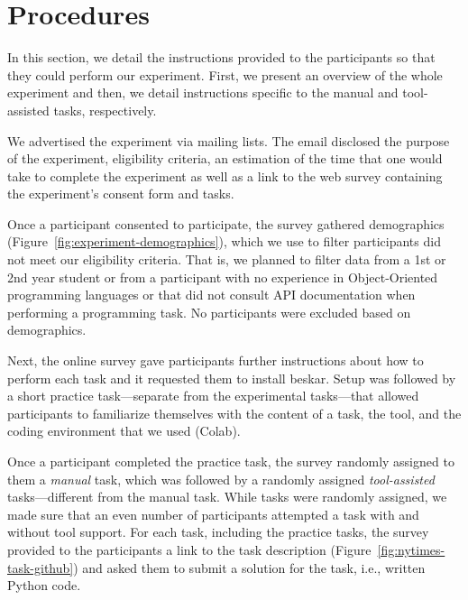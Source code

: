
\section{Procedures}
\label{cp6:procedures}





In this section, we detail the instructions provided to the participants so that 
they could perform our experiment. 
First, we present an overview of the whole experiment and then, we detail
instructions specific to the manual and tool-assisted tasks, respectively.



We advertised the experiment via mailing lists. The email disclosed the purpose of the experiment, eligibility criteria, an estimation of the time that one would take to complete the experiment as well as a link 
to the web survey containing the experiment's consent form and tasks. 




Once a participant consented to participate, the survey gathered demographics (Figure~\ref{fig:experiment-demographics}), which we use to filter participants did not meet our eligibility criteria. That is, we planned to filter data from a 1st or 2nd year student or from a participant with no experience in Object-Oriented programming languages or that did not consult API documentation when performing a programming task. No participants were excluded based on demographics.





Next, the online survey gave participants further instructions 
about how to perform each task and it requested them to install \acs{beskar}.
Setup was followed by a short practice task---separate from the experimental tasks---that allowed participants to familiarize themselves with the content of a task, the tool, and the coding environment that we used (Colab). 



Once a participant completed the practice task, the survey randomly assigned to them a \textit{manual} task, which was followed by a randomly assigned \textit{tool-assisted} tasks---different from the manual task. While tasks were randomly assigned, we made sure that an even number of participants attempted a task with and without tool support.
For each task, including the practice tasks, the survey provided to the participants a link 
to the task description (Figure~\ref{fig:nytimes-task-github}) and asked them to submit a solution for the task, i.e., written Python code. 



